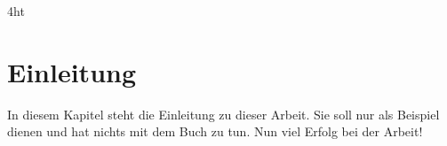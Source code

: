 \documentclass[
  ngerman,
  a4paper,  %
  twoside,  %
  bibliography=totoc,
  headsepline,
  cleardoublepage=empty,
  parskip=half,
  draft=false
]{scrbook}
\begin{document}
\listoffigures
\listoftables

\ifdeutsch
\else
\fi

\ifdeutsch
\else
\fi

\printnoidxglossaries

\iftex4ht
\else
\fi



\renewcommand*{\chapterpagestyle}{scrplain}
\pagestyle{scrheadings}
\pagestyle{scrheadings}
\ihead[]{}
\chead[]{}
\ohead[]{\headmark}
\cfoot[]{}
\ifoot[]{}

































%
%


\chapter{Einleitung}
In diesem Kapitel steht die Einleitung zu dieser Arbeit.
Sie soll nur als Beispiel dienen und hat nichts mit dem Buch \cite{WSPA} zu tun.
Nun viel Erfolg bei der Arbeit!
\end{document}
